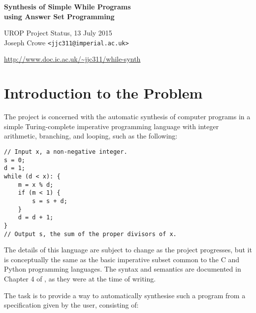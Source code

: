 \documentclass[a4paper,twoside,notitlepage,12pt]{article}
\begin{document}
\begin{titlepage}
\begin{center}
    {\Large \bfseries Synthesis of Simple While Programs \\ using Answer Set Programming}

    {\large UROP Project Status, 13 July 2015} \\[0.5cm]
    
    {\large Joseph Crowe} \texttt{<jjc311@imperial.ac.uk>}
    
    \url{http://www.doc.ic.ac.uk/~jjc311/while-synth}\\[2cm]

    \tableofcontents
\end{center}
\end{titlepage}

\section{Introduction to the Problem}

The project is concerned with the automatic synthesis of computer programs in a simple 
Turing-complete imperative programming language with integer arithmetic, branching, and
looping, such as the following:

\begin{verbatim}
// Input x, a non-negative integer.
s = 0;
d = 1;
while (d < x): {
    m = x % d;
    if (m < 1) {
        s = s + d;
    }
    d = d + 1;
}
// Output s, the sum of the proper divisors of x.
\end{verbatim}

The details of this language are subject to change as the project progresses, but it is 
conceptually the same as the basic imperative subset common to the C and Python 
programming languages. The syntax and semantics are documented in Chapter 4 of 
\cite{final}, as they were at the time of writing.

The task is to provide a way to automatically synthesise such a program from a 
specification given by the user, consisting of:
\end{document}
